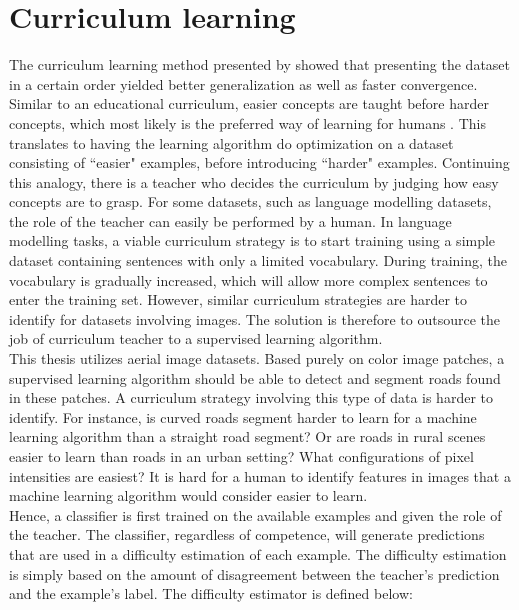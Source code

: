 \section{Curriculum learning}
\label{sec:curriculum_Learning}
The curriculum learning method presented by \cite{Bengio_curriculumlearning} showed that presenting the dataset in a certain order yielded better generalization as well as faster convergence. Similar to an educational curriculum, easier concepts are taught before harder concepts, which most likely is the preferred way of learning for humans \citep{Khan_human_teach}. This translates to having the learning algorithm do optimization on a dataset consisting of ``easier" examples, before introducing ``harder" examples. Continuing this analogy, there is a teacher who decides the curriculum by judging how easy concepts are to grasp. For some datasets, such as language modelling datasets, the role of the teacher can easily be performed by a human. In language modelling tasks, a viable curriculum strategy is to start training using a simple dataset containing sentences with only a limited vocabulary. During training, the vocabulary is gradually increased, which will allow more complex sentences to enter the training set. However, similar curriculum strategies are harder to identify for  datasets involving images. The solution is therefore to outsource the job of curriculum teacher to a supervised learning algorithm.  \\

This thesis utilizes aerial image datasets. Based purely on color image patches, a supervised learning algorithm should be able to detect and segment roads found in these patches. A curriculum strategy involving this type of data is harder to identify. For instance, is curved roads segment harder to learn for a machine learning algorithm than a straight road segment? Or are roads in rural scenes easier to learn than roads in an urban setting? What configurations of pixel intensities are easiest? It is hard for a human to identify features in images that a machine learning algorithm would consider easier to learn. \\


Hence, a classifier is first trained on the available examples and given the role of the teacher. The classifier, regardless of competence, will generate predictions that are used in a difficulty estimation of each example. The difficulty estimation is simply based on the amount of disagreement between the teacher's prediction and the example's label. The difficulty estimator is defined below:  \\

